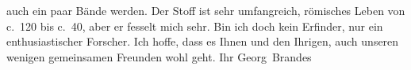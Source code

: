                auch ein paar Bände werden. Der Stoff ist sehr umfangreich, römisches Leben von c. 120 bis c. 40,
               aber er fesselt mich sehr. Bin ich doch kein Erfinder, nur ein enthusiastischer
               Forscher. Ich hoffe, dass es Ihnen und den Ihrigen, auch unseren wenigen gemeinsamen
               Freunden wohl geht. Ihr \spacefill\mbox{Georg Brandes}\pend
           \endnumbering{}  \newcommand{\dateiname}{L02282}\newcommand{\titel}{Georg Brandes an Arthur Schnitzler, 19. 12. 1917}\newcommand{\editorInnen}{Martin Anton Müller und Gerd-Hermann Susen}
